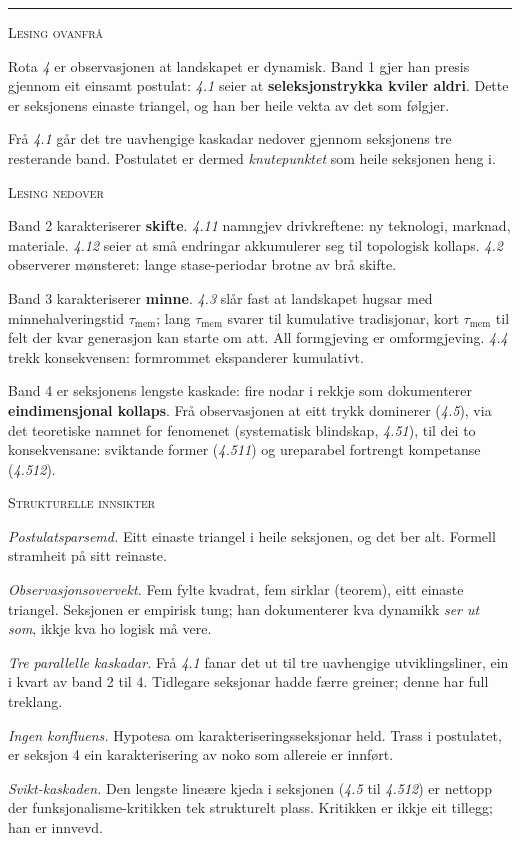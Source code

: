 \documentclass[a4paper,landscape,9pt]{article}
\begin{document}
\hrule

\vspace{0.4em}

\begin{minipage}[t]{0.325\textwidth}
{\scshape\small Lesing ovanfrå}

Rota \emph{4} er observasjonen at landskapet er dynamisk. Band 1 gjer han presis gjennom eit einsamt postulat: \emph{4.1} seier at \textbf{seleksjonstrykka kviler aldri}. Dette er seksjonens einaste triangel, og han ber heile vekta av det som følgjer.

Frå \emph{4.1} går det tre uavhengige kaskadar nedover gjennom seksjonens tre resterande band. Postulatet er dermed \emph{knutepunktet} som heile seksjonen heng i.
\end{minipage}\hfill
\begin{minipage}[t]{0.325\textwidth}
{\scshape\small Lesing nedover}

Band 2 karakteriserer \textbf{skifte}. \emph{4.11} namngjev drivkreftene: ny teknologi, marknad, materiale. \emph{4.12} seier at små endringar akkumulerer seg til topologisk kollaps. \emph{4.2} observerer mønsteret: lange stase-periodar brotne av brå skifte.

Band 3 karakteriserer \textbf{minne}. \emph{4.3} slår fast at landskapet hugsar med minnehalveringstid $\tau_{\mathrm{mem}}$; lang $\tau_{\mathrm{mem}}$ svarer til kumulative tradisjonar, kort $\tau_{\mathrm{mem}}$ til felt der kvar generasjon kan starte om att. All formgjeving er omformgjeving. \emph{4.4} trekk konsekvensen: formrommet ekspanderer kumulativt.

Band 4 er seksjonens lengste kaskade: fire nodar i rekkje som dokumenterer \textbf{eindimensjonal kollaps}. Frå observasjonen at eitt trykk dominerer (\emph{4.5}), via det teoretiske namnet for fenomenet (systematisk blindskap, \emph{4.51}), til dei to konsekvensane: sviktande former (\emph{4.511}) og ureparabel fortrengt kompetanse (\emph{4.512}).
\end{minipage}\hfill
\begin{minipage}[t]{0.325\textwidth}
{\scshape\small Strukturelle innsikter}

\emph{Postulatsparsemd.} Eitt einaste triangel i heile seksjonen, og det ber alt. Formell stramheit på sitt reinaste.

\emph{Observasjonsovervekt.} Fem fylte kvadrat, fem sirklar (teorem), eitt einaste triangel. Seksjonen er empirisk tung; han dokumenterer kva dynamikk \emph{ser ut som}, ikkje kva ho logisk må vere.

\emph{Tre parallelle kaskadar.} Frå \emph{4.1} fanar det ut til tre uavhengige utviklingsliner, ein i kvart av band 2 til 4. Tidlegare seksjonar hadde færre greiner; denne har full treklang.

\emph{Ingen konfluens.} Hypotesa om karakteriseringsseksjonar held. Trass i postulatet, er seksjon 4 ein karakterisering av noko som allereie er innført.

\emph{Svikt-kaskaden.} Den lengste lineære kjeda i seksjonen (\emph{4.5} til \emph{4.512}) er nettopp der funksjonalisme-kritikken tek strukturelt plass. Kritikken er ikkje eit tillegg; han er innvevd.
\end{minipage}
\end{document}
